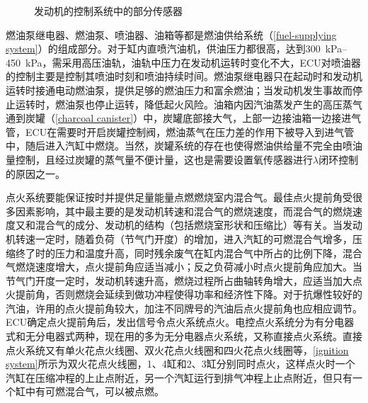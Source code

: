 \documentclass[UTF8]{ctexart}
\numberwithin{figure}{section}
\numberwithin{table}{section}
\begin{document}
\begin{figure}[htbp]
	\centering
	\caption{发动机的控制系统中的部分传感器}
	\label{sensors}
\end{figure}

燃油泵继电器、燃油泵、喷油器、油箱等都是燃油供给系统（\cref{fuel-supplying system}）的组成部分。对于缸内直喷汽油机，供油压力都很高，达到\qtyrange[range-phrase = $\,\sim\,$, range-units = single]{300}{450}{\kPa}，需采用高压油轨，油轨中压力在发动机运转时变化不大，ECU对喷油器的控制主要是控制其喷油时刻和喷油持续时间。燃油泵继电器只在起动时和发动机运转时接通电动燃油泵，提供足够的燃油压力和富余燃油；当发动机发生事故而停止运转时，燃油泵也停止运转，降低起火风险。油箱内因汽油蒸发产生的高压蒸气通到炭罐（\cref{charcoal canister}）中，炭罐底部接大气，上部一边接油箱一边接进气管，ECU在需要时开启炭罐控制阀，燃油蒸气在压力差的作用下被导入到进气管中，随后进入汽缸中燃烧。当然，炭罐系统的存在也使得燃油供给量不完全由喷油量控制，且经过炭罐的蒸气量不便计量，这也是需要设置氧传感器进行$\lambda$闭环控制的原因之一。

点火系统要能保证按时并提供足量能量点燃燃烧室内混合气。最佳点火提前角受很多因素影响，其中最主要的是发动机转速和混合气的燃烧速度，而混合气的燃烧速度又和混合气的成分、发动机的结构（包括燃烧室形状和压缩比）等有关。当发动机转速一定时，随着负荷（节气门开度）的增加，进入汽缸的可燃混合气增多，压缩终了时的压力和温度升高，同时残余废气在缸内混合气中所占的比例下降，混合气燃烧速度增大，点火提前角应适当减小；反之负荷减小时点火提前角应加大。当节气门开度一定时，发动机转速升高，燃烧过程所占曲轴转角增大，应适当加大点火提前角，否则燃烧会延续到做功冲程使得功率和经济性下降。对于抗爆性较好的汽油，许用的点火提前角较大，加注不同牌号的汽油后点火提前角也应相应调节。ECU确定点火提前角后，发出信号令点火系统点火。电控点火系统分为有分电器式和无分电器式两种，现在用的多为无分电器点火系统，又称直接点火系统。直接点火系统又有单火花点火线圈、双火花点火线圈和四火花点火线圈等，\cref{ignition system}所示为双火花点火线圈，1、4缸和2、3缸分别同时点火，这样点火时一个汽缸在压缩冲程的上止点附近，另一个汽缸运行到排气冲程上止点附近，但只有一个缸中有可燃混合气，可以被点燃。
\end{document}
